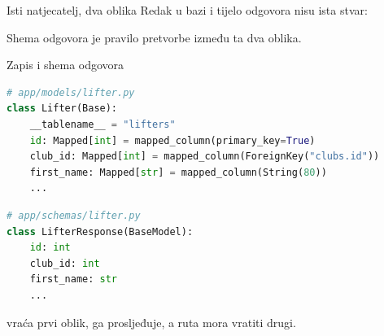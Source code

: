 \begin{frame}{Isti natjecatelj, dva oblika}
Redak u bazi i tijelo odgovora nisu ista stvar:

\vspace{0.7em}
\begin{center}
\end{center}

\vspace{0.7em}
Shema odgovora je pravilo pretvorbe između ta dva oblika.
\end{frame}

\begin{frame}[fragile]{Zapis i shema odgovora}
\begin{lstlisting}[language=python]
# app/models/lifter.py
class Lifter(Base):
    __tablename__ = "lifters"
    id: Mapped[int] = mapped_column(primary_key=True)
    club_id: Mapped[int] = mapped_column(ForeignKey("clubs.id"))
    first_name: Mapped[str] = mapped_column(String(80))
    ...
\end{lstlisting}

\vspace{0.15em}
\begin{lstlisting}[language=python]
# app/schemas/lifter.py
class LifterResponse(BaseModel):
    id: int
    club_id: int
    first_name: str
    ...
\end{lstlisting}

\vspace{0.15em}
 vraća prvi oblik,  ga prosljeđuje, a ruta mora vratiti drugi.
\end{frame}

